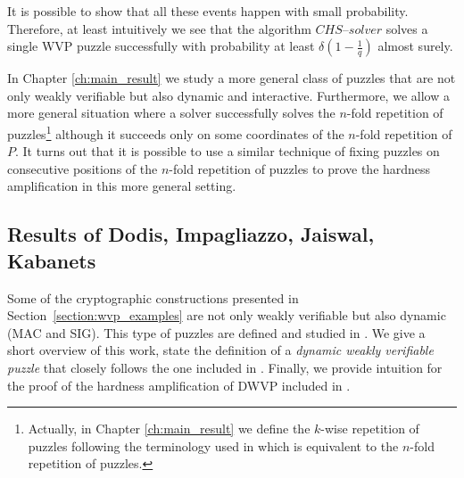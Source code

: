 It is possible to show that all these events happen with small probability.
Therefore, at least intuitively we see that the algorithm $\mathit{CHS\text{--}solver}$
solves a single WVP puzzle successfully with probability at least $\delta(1\!-\!\frac{1}{q})$ almost surely.

In Chapter \ref{ch:main_result} we study a more general class of puzzles that are not only weakly verifiable but also dynamic and interactive.
Furthermore, we allow a more general situation where a solver successfully solves the $n$-fold repetition of puzzles\footnote{Actually,
in Chapter \ref{ch:main_result} we define the $k$-wise repetition of puzzles following the terminology used in \cite{Dodis:2009:SAI:1530441.1530450}
which is equivalent to the $n$-fold repetition of puzzles.}
although it succeeds only on some coordinates of the $n$-fold repetition of $P$.
It turns out that it is possible to use a similar technique of fixing puzzles on consecutive positions of the $n$-fold repetition of
puzzles to prove the hardness amplification in this more general setting.
%
\subsection{Results of Dodis,  Impagliazzo,  Jaiswal,  Kabanets}
\label{subsec:dijk}
Some of the cryptographic constructions presented in Section~\ref{section:wvp_examples}
are not only weakly verifiable but also dynamic (MAC and SIG). This type of puzzles are defined and studied in \cite{Dodis:2009:SAI:1530441.1530450}.
We give a short overview of this work, state the definition of a \textit{dynamic weakly verifiable puzzle} that closely follows
the one included in \cite{Dodis:2009:SAI:1530441.1530450}. Finally, we provide intuition for the proof of the hardness amplification of DWVP
included in \cite{Dodis:2009:SAI:1530441.1530450}.

